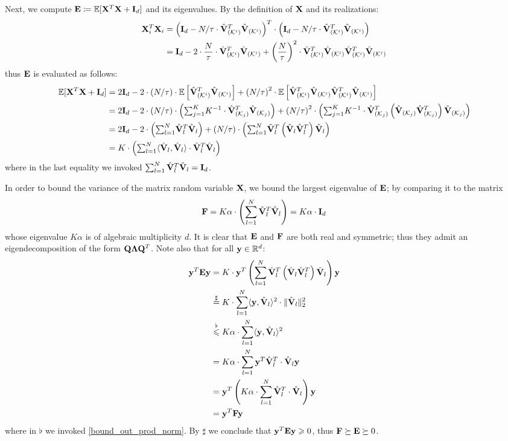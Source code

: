 \documentclass[journal,letterpaper,onecolumn,twoside,nofonttune]{IEEEtran}
\newcommand{\K}{\mathcal{K}}
\newcommand{\Qb}{\bold{Q}}
\newcommand{\Xb}{\bold{X}}
\newcommand{\yb}{\bold{y}}
\newcommand{\Fb}{\bold{F}}
\newcommand{\R}{\mathbb{R}}
\newcommand{\E}{\mathbb{E}}
\newcommand{\Eb}{\bold{E}}
\newcommand{\Ib}{\bold{I}}
\newcommand{\Vbh}{\hat{\bold{V}}}
\begin{document}
Next, we compute $\Eb\coloneqq\E[\Xb^T\Xb+\Ib_d]$ and its eigenvalues. By the definition of $\Xb$ and its realizations:
\begin{align*}
  \Xb_i^T\Xb_i &= \left(\Ib_d-N/\tau\cdot \Vbh_{(\K^i)}^T\Vbh_{(\K^i)}\right)^T \cdot \left(\Ib_d-N/\tau\cdot \Vbh_{(\K^i)}^T\Vbh_{(\K^i)}\right)\\
  &= \Ib_d-2\cdot\frac{N}{\tau}\cdot \Vbh_{(\K^i)}^T\Vbh_{(\K^i)} + \left(\frac{N}{\tau}\right)^2\cdot \Vbh_{(\K^i)}^T\Vbh_{(\K^i)}\Vbh_{(\K^i)}^T\Vbh_{(\K^i)}
\end{align*}
thus $\Eb$ is evaluated as follows:
\begin{subequations}
\label{E_eval}  %
\begin{align*}
  \E[\Xb^T\Xb+\Ib_d] &= 2\Ib_d - 2\cdot\left(N/\tau\right)\cdot\E\left[ \Vbh_{(\K^i)}^T\Vbh_{(\K^i)}\right] + \left(N/\tau\right)^2\cdot \E\left[\Vbh_{(\K^i)}^T\Vbh_{(\K^i)}\Vbh_{(\K^i)}^T\Vbh_{(\K^i)}\right]\\
  &= 2\Ib_d - 2\cdot\left(N/\tau\right)\cdot\left({\textstyle\sum_{j=1}^K}K^{-1}\cdot \Vbh_{(\K_j)}^T\Vbh_{(\K_j)}\right) + \left(N/\tau\right)^2\cdot\left({\textstyle\sum_{j=1}^K}K^{-1}\cdot \Vbh_{(\K_j)}^T\left(\Vbh_{(\K_j)}\Vbh_{(\K_j)}^T\right)\Vbh_{(\K_j)}\right)\\
  &= 2\Ib_d - 2\cdot\left({\textstyle\sum_{l=1}^N} \Vbh_l^T\Vbh_l\right) + (N/\tau)\cdot\left({\textstyle\sum_{l=1}^N} \Vbh_l^T\left(\Vbh_l\Vbh_l^T\right)\Vbh_l\right)\\
  &= K\cdot\left({\textstyle\sum_{l=1}^N} \langle \Vbh_l,\Vbh_l\rangle\cdot \Vbh_l^T\Vbh_l\right)
\end{align*}
\end{subequations}
where in the last equality we invoked $\sum_{l=1}^N \Vbh_l^T\Vbh_l=\Ib_d$.

In order to bound the variance of the matrix random variable $\Xb$, we bound the largest eigenvalue of $\Eb$; by comparing it to the matrix
$$ \Fb=K\alpha\cdot\left(\sum_{l=1}^N\Vbh_l^T\Vbh_l\right)=K\alpha\cdot\Ib_d $$
whose eigenvalue $K\alpha$ is of algebraic multiplicity $d$. It is clear that $\Eb$ and $\Fb$ are both real and symmetric; thus they admit an eigendecomposition of the form $\Qb\bold{\Lambda}\Qb^T$. Note also that for all $\yb\in\R^d$:
\begin{align}
  \yb^T\Eb\yb &= K\cdot \yb^T\left(\sum_{l=1}^N \Vbh_l^T\left(\Vbh_l\Vbh_l^T\right)\Vbh_l\right)\yb\notag\\
  &\overset{\sharp}{=} K\cdot\sum_{l=1}^N \langle \yb,\Vbh_l\rangle^2\cdot\|\Vbh_l\|_2^2\notag\\
  &\overset{\flat}{\leqslant} K\alpha\cdot\sum_{l=1}^N \langle \yb,\Vbh_l\rangle^2 \label{bound_quadr_E}\\
  &= K\alpha\cdot\sum_{l=1}^N\yb^T\Vbh_l^T\cdot\Vbh_l\yb\notag\\
  &= \yb^T\left(K\alpha\cdot\sum_{l=1}^N\Vbh_l^T\cdot\Vbh_l\right)\yb\notag\\
  &= \yb^T\Fb\yb\notag
\end{align}
where in $\flat$ we invoked \eqref{bound_out_prod_norm}. By $\sharp$ we conclude that $\yb^T\Eb\yb\geqslant0$, thus $\Fb\succeq\Eb\succeq0$.
\end{document}
